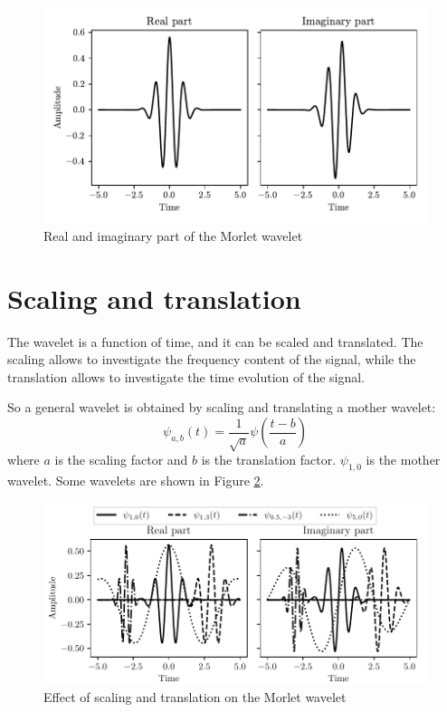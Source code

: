 \begin{figure}
\centering
\includegraphics[]{images/morlet.pdf}
\caption{Real and imaginary part of the Morlet wavelet}
\label{fig:morlet}
\end{figure}

\section{Scaling and translation}
The wavelet is a function of time, and it can be scaled and translated. The scaling allows to investigate the frequency content of the signal, while the translation allows to investigate the time evolution of the signal.

So a general wavelet is obtained by scaling and translating a mother wavelet:
\begin{equation}
\psi_{a,b}(t) = \frac{1}{\sqrt{a}} \psi \left( \frac{t-b}{a} \right)
\end{equation}
where $a$ is the scaling factor and $b$ is the translation factor. $\psi_{1,0}$ is the mother wavelet. Some wavelets are shown in Figure \ref{fig:wavelets}.

\begin{figure}
\centering
\includegraphics{images/morlet_trasl.pdf}
\caption{Effect of scaling and translation on the Morlet wavelet}
\label{fig:wavelets}
\end{figure}

